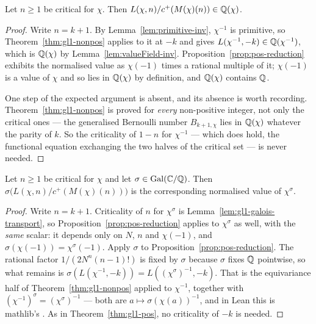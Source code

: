 \begin{theorem}
  \label{thm:gl1-pos}
  \leanok
  Let $n \geq 1$ be critical for $\chi$. Then $L(\chi,n)/c^{+}(M(\chi)(n)) \in \mathbb{Q}(\chi)$.
\end{theorem}
\begin{proof}
  \leanok
  Write $n = k+1$. By Lemma~\ref{lem:primitive-inv}, $\chi^{-1}$ is primitive, so
  Theorem~\ref{thm:gl1-nonpos} applies to it at $-k$ and gives
  $L(\chi^{-1},-k) \in \mathbb{Q}(\chi^{-1})$, which is $\mathbb{Q}(\chi)$ by
  Lemma~\ref{lem:valueField-inv}. Proposition~\ref{prop:pos-reduction} exhibits the
  normalised value as $\chi(-1)$ times a rational multiple of it; $\chi(-1)$ is a value of
  $\chi$ and so lies in $\mathbb{Q}(\chi)$ by definition, and $\mathbb{Q}(\chi)$ contains $\mathbb{Q}$.

  One step of the expected argument is absent, and its absence is worth recording.
  Theorem~\ref{thm:gl1-nonpos} is proved for \emph{every} non-positive integer, not only the
  critical ones --- the generalised Bernoulli number $B_{k+1,\chi}$ lies in $\mathbb{Q}(\chi)$
  whatever the parity of $k$. So the criticality of $1-n$ for $\chi^{-1}$ --- which does hold,
  the functional equation exchanging the two halves of the critical set --- is never needed.
\end{proof}

\begin{theorem}
  \label{thm:gl1-pos-equiv}
  \leanok
  Let $n \geq 1$ be critical for $\chi$ and let $\sigma \in \operatorname{Gal}(\mathbb{C}/\mathbb{Q})$. Then
  $\sigma\bigl(L(\chi,n)/c^{+}(M(\chi)(n))\bigr)$ is the corresponding normalised value of
  $\chi^{\sigma}$.
\end{theorem}
\begin{proof}
  \leanok
  Write $n = k+1$. Criticality of $n$ for $\chi^{\sigma}$ is
  Lemma~\ref{lem:gl1-galois-transport}, so
  Proposition~\ref{prop:pos-reduction} applies to $\chi^{\sigma}$ as well, with the
  \emph{same} scalar: it depends only on $N$, $n$ and $\chi(-1)$, and
  $\sigma(\chi(-1)) = \chi^{\sigma}(-1)$. Apply $\sigma$ to
  Proposition~\ref{prop:pos-reduction}. The rational factor $1/(2N^{n}(n-1)!)$ is fixed by
  $\sigma$ because $\sigma$ fixes $\mathbb{Q}$ pointwise, so what remains is
  $\sigma(L(\chi^{-1},-k)) = L((\chi^{\sigma})^{-1},-k)$. That is the equivariance half of
  Theorem~\ref{thm:gl1-nonpos} applied to $\chi^{-1}$, together with
  $(\chi^{-1})^{\sigma} = (\chi^{\sigma})^{-1}$ --- both are $a \mapsto \sigma(\chi(a))^{-1}$,
  and in Lean this is mathlib's . As in
  Theorem~\ref{thm:gl1-pos}, no criticality of $-k$ is needed.
\end{proof}

